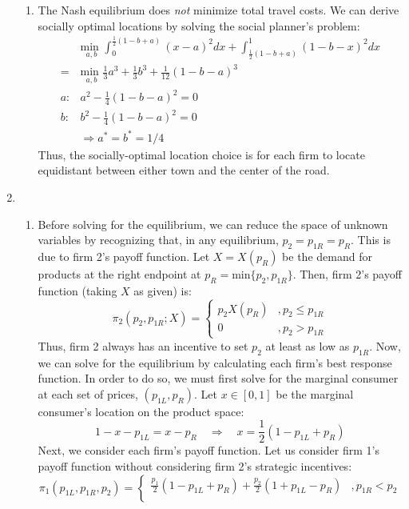 \documentclass{article}
\newcommand{\usmin}[1]{\underset{#1}{\text{min }}}
\begin{document}
\begin{enumerate}
\begin{enumerate}
    \item The Nash equilibrium does \textit{not} minimize total travel costs. We can derive socially optimal locations by solving the social planner's problem:
      \begin{align*} 
          &\usmin{a,b} \int_0^{\frac{1}{2}(1-b+a)}(x-a)^2dx + \int^1_{\frac{1}{2}(1-b+a)}(1-b-x)^2dx  \\
        = &\usmin{a,b} \frac{1}{3}a^3 + \frac{1}{3}b^3 + \frac{1}{12}(1-b-a)^3                        \\
        a: & a^2 - \frac{1}{4}(1-b-a)^2 = 0                                                           \\
        b: & b^2 - \frac{1}{4}(1-b-a)^2 = 0                                                           \\
        &\Rightarrow a^*=b^*=1/4
      \end{align*}
      Thus, the socially-optimal location choice is for each firm to locate equidistant between either town and the center of the road.
  \end{enumerate}
  \pagebreak
  \item 
  \begin{enumerate}
    \item Before solving for the equilibrium, we can reduce the space of unknown variables by recognizing that, in any equilibrium, ${p_2=p_{1R}=p_R}$. This is due to firm 2's payoff function. Let ${X=X(p_R)}$ be the demand for products at the right endpoint at ${p_R=\text{min}\{p_2,p_{1R}\}}$. Then, firm 2's payoff function (taking $X$ as given) is: \[
      \pi_2(p_2,p_{1R};X) = \begin{cases}
        p_2X(p_R) &, p_2\leq p_{1R} \\
        0         &, p_2>p_{1R}
      \end{cases}
    \]
    Thus, firm 2 always has an incentive to set $p_2$ at least as low as $p_{1R}$. Now, we can solve for the equilibrium by calculating each firm's best response function. In order to do so, we must first solve for the marginal consumer at each set of prices, $(p_{1L}, p_R)$. Let $x\in[0,1]$ be the marginal consumer's location on the product space:\[
      1-x - p_{1L} = x - p_R\quad\Rightarrow\quad x= \frac{1}{2}\left(1-p_{1L}+p_R\right)
    \]
    Next, we consider each firm's payoff function. Let us consider firm 1's payoff function without considering firm 2's strategic incentives:\[
      \pi_1(p_{1L}, p_{1R}, p_2) = \begin{cases}
        \frac{p_1}{2}\left(1-p_{1L}+p_R\right) + \frac{p_2}{2}\left(1+p_{1L}-p_R\right) &, p_{1R}<p_2     \\

\end{cases}\]
\end{enumerate}
\end{enumerate}
\end{document}
